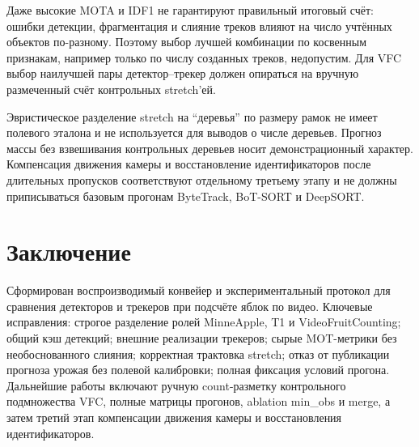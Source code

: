 \documentclass[12pt,a4paper]{article}
\begin{document}
Даже высокие MOTA и IDF1 не гарантируют правильный итоговый счёт: ошибки
детекции, фрагментация и слияние треков влияют на число учтённых объектов
по-разному. Поэтому выбор лучшей комбинации по косвенным признакам,
например только по числу созданных треков, недопустим. Для VFC выбор
наилучшей пары детектор--трекер должен опираться на вручную размеченный
счёт контрольных stretch'ей.

Эвристическое разделение stretch на ``деревья'' по размеру рамок не имеет
полевого эталона и не используется для выводов о числе деревьев. Прогноз
массы без взвешивания контрольных деревьев носит демонстрационный характер.
Компенсация движения камеры и восстановление идентификаторов после длительных
пропусков соответствуют отдельному третьему этапу и не должны приписываться
базовым прогонам ByteTrack, BoT-SORT и DeepSORT.

\section{Заключение}

Сформирован воспроизводимый конвейер и экспериментальный протокол для
сравнения детекторов и трекеров при подсчёте яблок по видео. Ключевые
исправления: строгое разделение ролей MinneApple, T1 и VideoFruitCounting;
общий кэш детекций; внешние реализации трекеров; сырые MOT-метрики без
необоснованного слияния; корректная трактовка stretch; отказ от публикации
прогноза урожая без полевой калибровки; полная фиксация условий прогона.
Дальнейшие работы включают ручную count-разметку контрольного подмножества
VFC, полные матрицы прогонов, ablation min\_obs и merge, а затем третий
этап компенсации движения камеры и восстановления идентификаторов.
\end{document}
